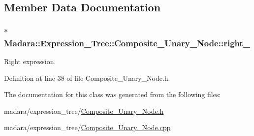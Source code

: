 \subsection{Member Data Documentation}
\hypertarget{classMadara_1_1Expression__Tree_1_1Composite__Unary__Node_a077b7bd1b52df6f5c6adfde735556a68}{
\subsubsection[{right\_\-}]{$\ast$ {\bf Madara::Expression\_\-Tree::Composite\_\-Unary\_\-Node::right\_\-}}}
\label{d3/dc7/classMadara_1_1Expression__Tree_1_1Composite__Unary__Node_a077b7bd1b52df6f5c6adfde735556a68}


Right expression. 



Definition at line 38 of file Composite\_\-Unary\_\-Node.h.



The documentation for this class was generated from the following files:\begin{DoxyCompactItemize}
\item 
madara/expression\_\-tree/\hyperlink{Composite__Unary__Node_8h}{Composite\_\-Unary\_\-Node.h}\item 
madara/expression\_\-tree/\hyperlink{Composite__Unary__Node_8cpp}{Composite\_\-Unary\_\-Node.cpp}\end{DoxyCompactItemize}

